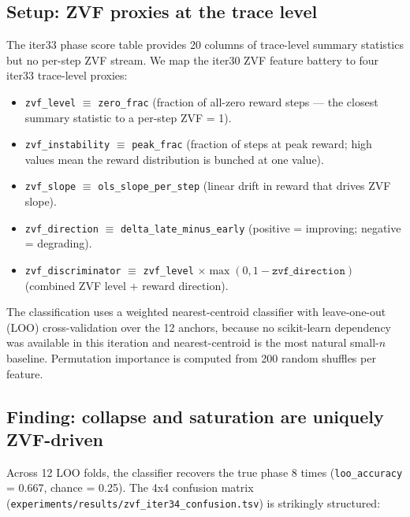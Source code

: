 \documentclass{article}
\begin{document}
\subsection{Setup: ZVF proxies at the trace level}
\label{sec:zvf-iter34-setup}

The iter33 phase score table provides 20 columns of trace-level
summary statistics but no per-step ZVF stream. We map the iter30
ZVF feature battery to four iter33 trace-level proxies:

\begin{itemize}
\item \texttt{zvf\_level} $\equiv$ \texttt{zero\_frac} (fraction
of all-zero reward steps --- the closest summary statistic to a
per-step ZVF = 1).
\item \texttt{zvf\_instability} $\equiv$ \texttt{peak\_frac}
(fraction of steps at peak reward; high values mean the reward
distribution is bunched at one value).
\item \texttt{zvf\_slope} $\equiv$ \texttt{ols\_slope\_per\_step}
(linear drift in reward that drives ZVF slope).
\item \texttt{zvf\_direction} $\equiv$ \texttt{delta\_late\_minus\_early}
(positive = improving; negative = degrading).
\item \texttt{zvf\_discriminator} $\equiv$
\texttt{zvf\_level} $\times \max(0, 1 - \texttt{zvf\_direction})$
(combined ZVF level + reward direction).
\end{itemize}

The classification uses a weighted nearest-centroid classifier
with leave-one-out (LOO) cross-validation over the 12 anchors,
because no scikit-learn dependency was available in this iteration
and nearest-centroid is the most natural small-$n$ baseline.
Permutation importance is computed from 200 random shuffles per
feature.

\subsection{Finding: collapse and saturation are uniquely ZVF-driven}
\label{sec:zvf-iter34-finding}

Across 12 LOO folds, the classifier recovers the true phase 8
times (\texttt{loo\_accuracy} = 0.667, chance = 0.25). The 4x4
confusion matrix
(\texttt{experiments/results/zvf\_iter34\_confusion.tsv}) is
strikingly structured:
\end{document}
